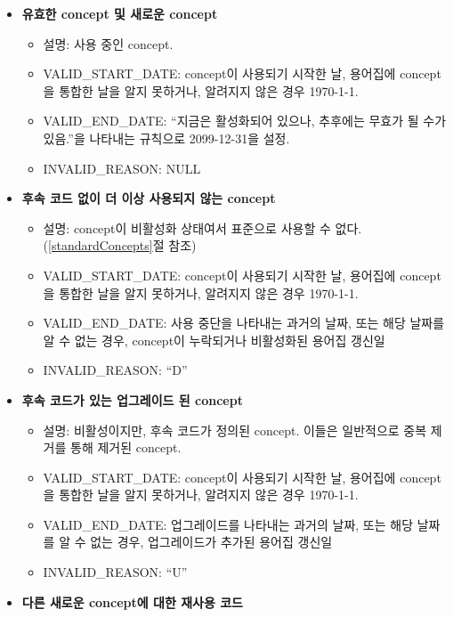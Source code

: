 \documentclass[11pt]{book}
\providecommand{\tightlist}{%
  \setlength{\itemsep}{0pt}\setlength{\parskip}{0pt}}
\theoremstyle{definition}
\theoremstyle{definition}
\theoremstyle{definition}
\theoremstyle{remark}
\begin{document}
\begin{itemize}
\tightlist
\item
  \textbf{유효한 concept 및 새로운 concept}

  \begin{itemize}
  \tightlist
  \item
    설명: 사용 중인 concept.
  \item
    VALID\_START\_DATE: concept이 사용되기 시작한 날, 용어집에 concept을
    통합한 날을 알지 못하거나, 알려지지 않은 경우 1970-1-1.
  \item
    VALID\_END\_DATE: ``지금은 활성화되어 있으나, 추후에는 무효가 될
    수가 있음.''을 나타내는 규칙으로 2099-12-31을 설정.
  \item
    INVALID\_REASON: NULL
  \end{itemize}
\item
  \textbf{후속 코드 없이 더 이상 사용되지 않는 concept}

  \begin{itemize}
  \tightlist
  \item
    설명: concept이 비활성화 상태여서 표준으로 사용할 수 없다.
    (\ref{standardConcepts}절 참조)
  \item
    VALID\_START\_DATE: concept이 사용되기 시작한 날, 용어집에 concept을
    통합한 날을 알지 못하거나, 알려지지 않은 경우 1970-1-1.
  \item
    VALID\_END\_DATE: 사용 중단을 나타내는 과거의 날짜, 또는 해당 날짜를
    알 수 없는 경우, concept이 누락되거나 비활성화된 용어집 갱신일
  \item
    INVALID\_REASON: ``D''
  \end{itemize}
\item
  \textbf{후속 코드가 있는 업그레이드 된 concept}

  \begin{itemize}
  \tightlist
  \item
    설명: 비활성이지만, 후속 코드가 정의된 concept. 이들은 일반적으로
    중복 제거를 통해 제거된 concept.
  \item
    VALID\_START\_DATE: concept이 사용되기 시작한 날, 용어집에 concept을
    통합한 날을 알지 못하거나, 알려지지 않은 경우 1970-1-1.
  \item
    VALID\_END\_DATE: 업그레이드를 나타내는 과거의 날짜, 또는 해당
    날짜를 알 수 없는 경우, 업그레이드가 추가된 용어집 갱신일
  \item
    INVALID\_REASON: ``U''
  \end{itemize}
\item
  \textbf{다른 새로운 concept에 대한 재사용 코드}


\end{itemize}
\end{document}
